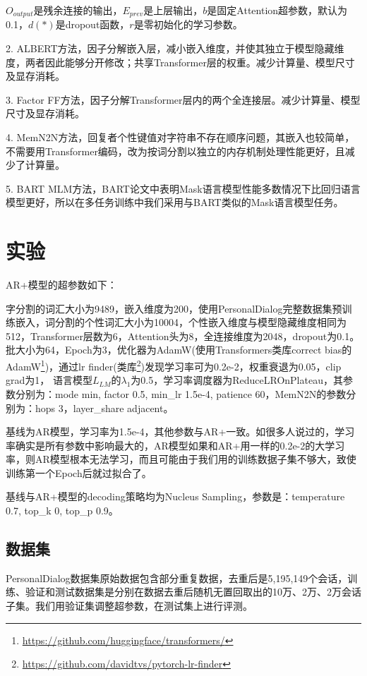 \documentclass[letterpaper]{article} %
\DeclareRobustCommand{\citeext}[1]{\cite[#1]{#1}}
\begin{document}
\begin{CJK*}{UTF8}{gbsn}
$O_{output}$是残余连接的输出，$E_{prev}$是上层输出，$b$是固定Attention超参数，默认为0.1，$d(*)$是dropout函数，$r$是零初始化的学习参数。

2. ALBERT\citeext{Lan2019}方法，因子分解嵌入层，减小嵌入维度，并使其独立于模型隐藏维度，两者因此能够分开修改；共享Transformer层的权重。减少计算量、模型尺寸及显存消耗。

3. Factor FF方法，因子分解Transformer层内的两个全连接层。减少计算量、模型尺寸及显存消耗。

4. MemN2N\citeext{Sukhbaatar2015}方法，回复者个性键值对字符串不存在顺序问题，其嵌入也较简单，不需要用Transformer编码，改为按词分割以独立的内存机制处理性能更好，且减少了计算量。

5. BART MLM\citeext{Lewis2019}方法，BART论文中表明Mask语言模型性能多数情况下比回归语言模型更好，所以在多任务训练中我们采用与BART类似的Mask语言模型任务。

\section[Experiments]{实验} 
AR+模型的超参数如下：

字分割的词汇大小为9489，嵌入维度为200，使用PersonalDialog完整数据集预训练嵌入，词分割的个性词汇大小为10004，个性嵌入维度与模型隐藏维度相同为512，Transformer层数为6，Attention头为8，全连接维度为2048，dropout为0.1。
批大小为64，Epoch为3，优化器为AdamW(使用Transformers类库correct bias的\\AdamW\footnote{\url{https://github.com/huggingface/transformers/}})，通过lr finder\citeext{Smith2015}(类库\footnote{\url{https://github.com/davidtvs/pytorch-lr-finder}})发现学习率可为0.2e-2，权重衰退为0.05，clip grad为1，
语言模型$L_{LM}$的$\lambda_1$为0.5，学习率调度器为ReduceLROnPlateau，其参数分别为：mode min, factor 0.5, min\_lr 1.5e-4, patience 60，MemN2N的参数分别为：hops 3，layer\_share adjacent。

基线为AR模型，学习率为1.5e-4，其他参数与AR+一致。如很多人说过的，学习率确实是所有参数中影响最大的，AR模型如果和AR+用一样的0.2e-2的大学习率，则AR模型根本无法学习，而且可能由于我们用的训练数据子集不够大，致使训练第一个Epoch后就过拟合了。

基线与AR+模型的decoding策略均为Nucleus Sampling\citeext{Holtzman2019}，参数是：temperature 0.7, top\_k 0, top\_p 0.9。

\subsection[Datasets]{数据集} 
PersonalDialog数据集原始数据包含部分重复数据，去重后是5,195,149个会话，训练、验证和测试数据集是分别在数据去重后随机无置回取出的10万、2万、2万会话子集。我们用验证集调整超参数，在测试集上进行评测。


\end{CJK*}
\end{document}
